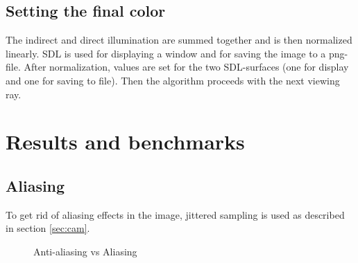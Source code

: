 \documentclass[a4paper]{report}
\begin{document}
\section{Setting the final color}

The indirect and direct illumination are summed together and is
then normalized linearly. SDL \cite{sdl} is used for
displaying a window and for saving the image to a png-file. After
normalization, values are set for the two SDL-surfaces (one for
display and one for saving to file). Then the
algorithm proceeds with the next viewing ray.

\chapter{Results and benchmarks}
\label{ch:results}

\section{Aliasing}

To get rid of aliasing effects in the image, jittered sampling is used
as described in section \ref{sec:cam}.

\begin{figure}
  \centering
  \caption{Anti-aliasing vs Aliasing}
  \label{fig:aliasingcomp}
\end{figure}
\end{document}
